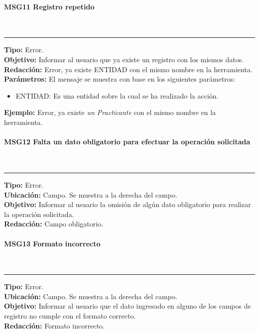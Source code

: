 \paragraph{\textcolor[rgb]{0, 0, 0.545098}{MSG11 Registro repetido}} \hspace{1cm} \\
\label{msj:MSG11}
\rule[3mm]{16.59cm}{0.1mm} \vspace{1mm}
\textbf{Tipo:} Error.\\
\textbf{Objetivo:} Informar al usuario que ya existe un registro con los mismos datos.\\
\textbf{Redacción:} Error, ya existe ENTIDAD con el mismo nombre en la herramienta.\\
\textbf{Parámetros:} El mensaje se muestra con base en los siguientes parámetros:
\begin{itemize} \itemsep1pt \parskip0pt 
	\item ENTIDAD: Es una entidad sobre la cual se ha realizado  la acción.
\end{itemize}
\textbf{Ejemplo:} Error, ya existe \textit{un Practicante} con el mismo nombre en la herramienta.\\

\paragraph{\textcolor[rgb]{0, 0, 0.545098}{MSG12 Falta un dato obligatorio para efectuar la operación solicitada}} \hspace{1cm} \\
\label{msj:MSG12}
\rule[3mm]{16.59cm}{0.1mm} \vspace{1mm}
\textbf{Tipo:} Error.\\
\textbf{Ubicación:} Campo. Se muestra a la derecha del campo.\\
\textbf{Objetivo:} Informar al usuario la omisión de algún dato obligatorio para realizar la operación solicitada.\\
\textbf{Redacción:} Campo obligatorio.\\

\paragraph{\textcolor[rgb]{0, 0, 0.545098}{MSG13 Formato incorrecto}} \hspace{1cm} \\
\label{msj:MSG13}
\rule[3mm]{16.59cm}{0.1mm} \vspace{1mm}
\textbf{Tipo:} Error.\\
\textbf{Ubicación:} Campo. Se muestra a la derecha del campo.\\
\textbf{Objetivo:} Informar al usuario que el dato ingresado en alguno de los campos de registro no cumple con el formato correcto.\\
\textbf{Redacción:} Formato incorrecto.\\


